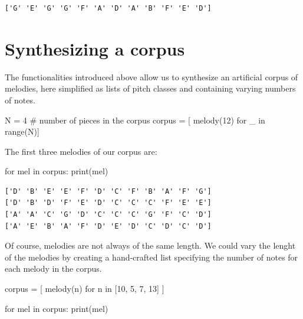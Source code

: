 \documentclass[
  a4paperpaper,
  ,captions=tableheading
]{scrbook}
\newenvironment{Shaded}{\begin{snugshade}}{\end{snugshade}}
\newcommand{\BuiltInTok}[1]{\textcolor[rgb]{0.00,0.23,0.31}{#1}}
\newcommand{\CommentTok}[1]{\textcolor[rgb]{0.37,0.37,0.37}{#1}}
\newcommand{\ControlFlowTok}[1]{\textcolor[rgb]{0.00,0.23,0.31}{#1}}
\newcommand{\DecValTok}[1]{\textcolor[rgb]{0.68,0.00,0.00}{#1}}
\newcommand{\KeywordTok}[1]{\textcolor[rgb]{0.00,0.23,0.31}{#1}}
\newcommand{\NormalTok}[1]{\textcolor[rgb]{0.00,0.23,0.31}{#1}}
\newcommand{\OperatorTok}[1]{\textcolor[rgb]{0.37,0.37,0.37}{#1}}
\begin{document}
\begin{verbatim}
['G' 'E' 'G' 'G' 'F' 'A' 'D' 'A' 'B' 'F' 'E' 'D']
\end{verbatim}

\hypertarget{synthesizing-a-corpus}{%
\section{Synthesizing a corpus}\label{synthesizing-a-corpus}}

The functionalities introduced above allow us to synthesize an
artificial corpus of melodies, here simplified as lists of pitch classes
and containing varying numbers of notes.

\begin{Shaded}
\begin{Highlighting}[]
\NormalTok{N }\OperatorTok{=} \DecValTok{4} \CommentTok{\# number of pieces in the corpus}
\NormalTok{corpus }\OperatorTok{=}\NormalTok{ [ melody(}\DecValTok{12}\NormalTok{) }\ControlFlowTok{for}\NormalTok{ \_ }\KeywordTok{in} \BuiltInTok{range}\NormalTok{(N)]}
\end{Highlighting}
\end{Shaded}

The first three melodies of our corpus are:

\begin{Shaded}
\begin{Highlighting}[]
\ControlFlowTok{for}\NormalTok{ mel }\KeywordTok{in}\NormalTok{ corpus:}
    \BuiltInTok{print}\NormalTok{(mel)}
\end{Highlighting}
\end{Shaded}

\begin{verbatim}
['D' 'B' 'E' 'E' 'F' 'D' 'C' 'F' 'B' 'A' 'F' 'G']
['D' 'B' 'D' 'F' 'E' 'D' 'C' 'C' 'C' 'F' 'E' 'E']
['A' 'A' 'C' 'G' 'D' 'C' 'C' 'C' 'G' 'F' 'C' 'D']
['A' 'E' 'B' 'A' 'F' 'D' 'E' 'D' 'C' 'D' 'C' 'D']
\end{verbatim}

Of course, melodies are not always of the same length. We could vary the
lenght of the melodies by creating a hand-crafted list specifying the
number of notes for each melody in the corpus.

\begin{Shaded}
\begin{Highlighting}[]
\NormalTok{corpus }\OperatorTok{=}\NormalTok{ [ melody(n) }\ControlFlowTok{for}\NormalTok{ n }\KeywordTok{in}\NormalTok{ [}\DecValTok{10}\NormalTok{, }\DecValTok{5}\NormalTok{, }\DecValTok{7}\NormalTok{, }\DecValTok{13}\NormalTok{] ]}

\ControlFlowTok{for}\NormalTok{ mel }\KeywordTok{in}\NormalTok{ corpus:}
    \BuiltInTok{print}\NormalTok{(mel)}
\end{Highlighting}
\end{Shaded}
\end{document}
